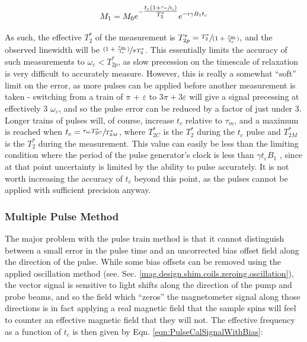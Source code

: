 \documentclass[PaulGanssle-Thesis.tex]{subfiles}
\begin{document}
\begin{equation}
\label{eqn:PulseCalibrationTrainEvolution}
M_{1} = M_{0}e^{-\tfrac{t_{c}\left(1 + \sfrac{\tau_{m}}{t_{c}}\right)}{T_{2}^*}}e^{-i\gamma B_{1}t_{c}}
\end{equation}

As such, the effective $T_{2}^*$ of the measurement is $T_{2p}^* = \sfrac{T_{2}^*}{(1+\tfrac{\tau_{m}}{t_{c}})}$, and the observed linewidth will be $\sfrac{(1+\tfrac{\tau_{m}}{t_{c}})}{\pi T_{2}^*}$. This essentially limits the accuracy of such measurements to $\omega_{\varepsilon} < T_{2p}^*$, as slow precession on the timescale of relaxation is very difficult to accurately measure. However, this is really a somewhat ``soft'' limit on the error, as more pulses can be applied before another measurement is taken - switching from a train of $\pi$ + $\varepsilon$ to $3\pi + 3\varepsilon$ will give a signal precessing at effectively 3 $\omega_{\varepsilon}$, and so the pulse error can be reduced by a factor of just under 3. Longer trains of pulses will, of course, increase $t_{c}$ relative to $\tau_{m}$, and a maximum is reached when $t_{c} = \sfrac{\tau_{m}T_{2C}^*}{T_{2M}^*}$, where $T_{2C}^*$ is the $T_{2}^*$ during the $t_{c}$ pulse and $T_{2M}^*$ is the $T_{2}^*$ during the measurement. This value can easily be less than the limiting condition where the period of the pulse generator's clock is less than $\gamma t_{\varepsilon} B_{1}$ , since at that point uncertainty is limited by the ability to pulse accurately. It is not worth increasing the accuracy of $t_{c}$ beyond this point, as the pulses cannot be applied with sufficient precision anyway.

\subsubsection{Multiple Pulse Method}
\label{nmr.pulsecal.multiplepulse}
The major problem with the pulse train method is that it cannot distinguish between a small error in the pulse time and an uncorrected bias offset field along the direction of the pulse. While some bias offsets can be removed using the applied oscillation method (see. Sec. \ref{mag.design.shim.coils.zeroing.oscillation}), the vector signal is sensitive to light shifts along the direction of the pump and probe beams, and so the field which ``zeros'' the magnetometer signal along those directions is in fact applying a real magnetic field that the sample spins will feel to counter an effective magnetic field that they will not. The effective frequency as a function of $t_{c}$ is then given by Eqn. \ref{eqn:PulseCalSignalWithBias}:
\end{document}
